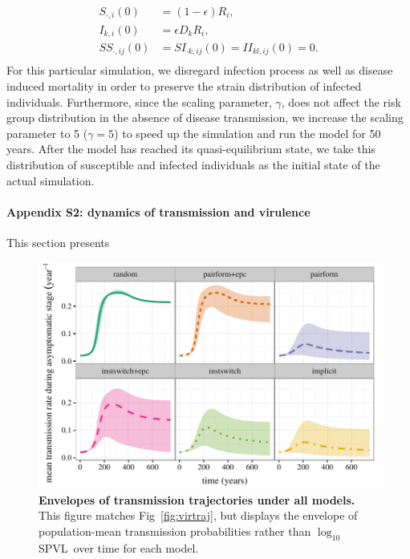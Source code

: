 \documentclass[10pt,letterpaper]{article}
\renewcommand{\figurename}{Fig}
\newcommand{\Lspvl}{$\log_{10}$ SPVL}
\begin{document}
\begin{equation}
\begin{aligned}
S_{\cdot,i}(0) &= (1 - \epsilon) R_i,\\
I_{k,i}(0) &= \epsilon D_k R_i,\\
SS_{\cdot,ij}(0) &= SI_{\cdot k, ij}(0) = II_{kl,ij} (0) = 0.\\
\end{aligned}
\end{equation}
For this particular simulation, we disregard infection process as well as disease induced mortality in order to preserve the strain distribution of infected individuals. Furthermore, since the scaling parameter, $\gamma$, does not affect the risk group distribution in the absence of disease transmission, we increase the scaling parameter to 5 ($\gamma = 5$) to speed up the simulation and run the model for 50 years. After the model has reached its quasi-equilibrium state, we take this distribution of susceptible and infected individuals as the initial state of the actual simulation.

\paragraph*{Appendix S2: dynamics of transmission and virulence}

\label{S2_Appendix}

This section presents

\begin{figure}[!ht]
\includegraphics[width=\textwidth]{../figures/fig_S2_1.pdf}
\caption{{\bf Envelopes of transmission trajectories under all models.}
This figure matches \figurename~\ref{fig:virtraj}, but displays the
envelope of population-mean transmission probabilities rather than \Lspvl\ over time
for each model.
}
\label{fig:transtraj}
\end{figure}
\end{document}
